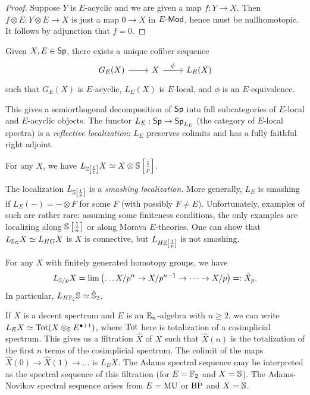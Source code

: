 \documentclass{article}
\begin{document}
\begin{proof}
	Suppose $Y$ is $E$-acyclic and we are given a map $f: Y \to X$.
	Then $f \otimes E: Y \otimes E \to X$ is just a map $0 \to X$ in $E\textrm{-}\mathsf{Mod}$, hence must be nullhomotopic.
	It follows by adjunction that $f = 0$.
\end{proof}

\begin{thm}[Bousfield]
	Given $X, E \in \mathsf{Sp}$, there exists a unique cofiber sequence
	\[
		\begin{tikzcd}
			G_E(X) \rar & X \rar["\phi"] & L_E(X)
		\end{tikzcd}
	\]
	such that $G_E(X)$ is $E$-acyclic, $L_E(X)$ is $E$-local, and $\phi$ is an $E$-equivalence.
\end{thm}

This gives a semiorthogonal decomposition of $\mathsf{Sp}$ into full subcategories of $E$-local and $E$-acyclic objects.
The functor $L_E: \mathsf{Sp} \to \mathsf{Sp}_{L_E}$ (the category of $E$-local spectra) is a \emph{reflective localization}: $L_E$ preserves colimits and has a fully faithful right adjoint.

\begin{ex}
	For any $X$, we have $L_{\mathbb{S}\left[\frac{1}{p}\right]} X \simeq X \otimes \mathbb{S}\left[\frac{1}{p}\right]$.
\end{ex}

The localization $L_{\mathbb{S}\left[\frac{1}{p}\right]}$ is a \emph{smashing localization}.
More generally, $L_E$ is smashing if $L_E(-) = - \otimes F$ for some $F$ (with possibly $F \neq E$).
Unfortunately, examples of such are rather rare: assuming some finiteness conditions, the only examples are localizing along $\mathbb{S}\left[\frac{1}{n}\right]$ or along Morava $E$-theories.
One can show that $L_{\mathbb{S}_G} X \simeq L_{HG} X$ is $X$ is connective, but $L_{H\mathbb{Z}\left[\frac{1}{p}\right]}$ is not smashing.

\begin{ex}
	For any $X$ with finitely generated homotopy groups, we have
	\[
		L_{\mathbb{S}/p} X = \lim \left(\dots X / p^n \to X / p^{n-1} \to \dots \to X / p \right) =: \hat{X}_p.
	\]
	In particular, $L_{H\mathbb{F}_2} \mathbb{S} \simeq \hat{\mathbb{S}}_2$.
\end{ex}

If $X$ is a decent spectrum and $E$ is an $\mathbb{E}_n$-algebra with $n \geq 2$, we can write $L_E X \simeq \operatorname{Tot}(X \otimes_{\mathbb{S}} E^{\bullet + 1})$, where $\operatorname{Tot}$ here is totalization of a cosimplicial spectrum.
This gives us a filtration $\hat{X}$ of $X$ such that $\hat{X}(n)$ is the totalization of the first $n$ terms of the cosimplicial spectrum.
The colimit of the maps $\hat{X}(0) \to \hat{X}(1) \to \dots$ is $L_E X$.
The Adams spectral sequence may be interpreted as the spectral sequence of this filtration (for $E = \mathbb{F}_2$ and $X = \mathbb{S}$).
The Adams-Novikov spectral sequence arises from $E = \mathrm{MU}$ or $\mathrm{BP}$ and $X = \mathbb{S}$.
\end{document}
